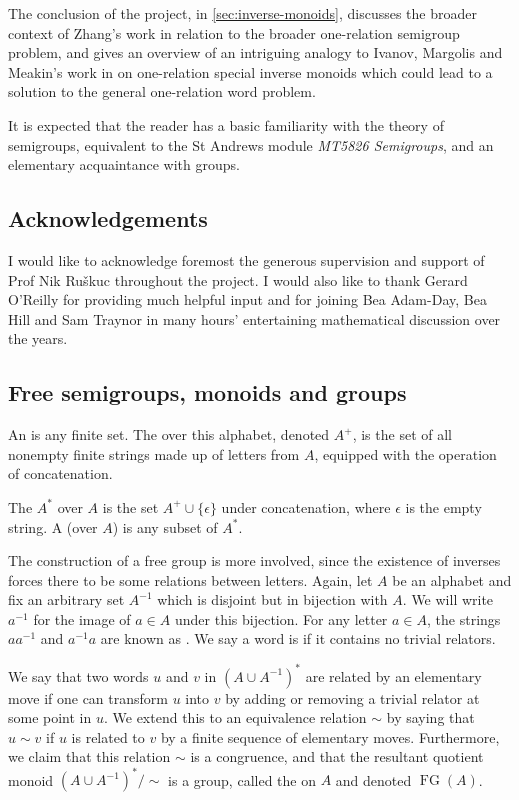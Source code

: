 \documentclass[noindex,noinsetproof,emphthm,12pt]{lmaths}
\DeclareMathOperator{\FG}{FG}
\begin{document}
The conclusion of the project, in \cref{sec:inverse-monoids}, discusses the broader context of Zhang's work in relation to the broader one-relation semigroup problem, and gives an overview of an intriguing analogy to Ivanov, Margolis and Meakin's work in \cite{Ivanov2001} on one-relation special inverse monoids which could lead to a solution to the general one-relation word problem.

It is expected that the reader has a basic familiarity with the theory of semigroups, equivalent to the St Andrews module \emph{MT5826 Semigroups}, and an elementary acquaintance with groups.

\subsection*{Acknowledgements}
I would like to acknowledge foremost the generous supervision and support of Prof Nik Ruškuc throughout the project. I would also like to thank Gerard O'Reilly for providing much helpful input and for joining Bea Adam-Day, Bea Hill and Sam Traynor in many hours' entertaining mathematical discussion over the years.

\subsection{Free semigroups, monoids and groups}

An  is any finite set. The  over this alphabet, denoted $A^{+}$, is the set of all nonempty finite strings made up of letters from $A$, equipped with the operation of concatenation.

The  $A^*$ over $A$ is the set $A^+ \cup \{\epsilon\}$ under concatenation, where $\epsilon$ is the empty string. A  (over $A$) is any subset of $A^*$.

The construction of a free group is more involved, since the existence of inverses forces there to be some relations between letters. Again, let $A$ be an alphabet and fix an arbitrary set $A^{-1}$ which is disjoint but in bijection with $A$. We will write $a^{-1}$ for the image of $a \in A$ under this bijection. For any letter $a \in A$, the strings $aa^{-1}$ and $a^{-1}a$ are known as . We say a word is  if it contains no trivial relators.

We say that two words $u$ and $v$ in $(A \cup A^{-1})^*$ are related by an elementary move if one can transform $u$ into $v$ by adding or removing a trivial relator at some point in $u$. We extend this to an equivalence relation $\sim$ by saying that $u \sim v$ if $u$ is related to $v$ by a finite sequence of elementary moves.  Furthermore, we claim that this relation $\sim$ is a congruence, and that the resultant quotient monoid $(A \cup A^{-1})^*/{\sim}$ is a group, called the  on $A$ and denoted $\FG(A)$.
\end{document}
